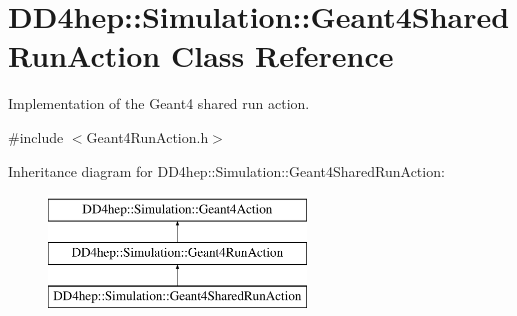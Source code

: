 \hypertarget{class_d_d4hep_1_1_simulation_1_1_geant4_shared_run_action}{}\section{D\+D4hep\+:\+:Simulation\+:\+:Geant4\+Shared\+Run\+Action Class Reference}
\label{class_d_d4hep_1_1_simulation_1_1_geant4_shared_run_action}


Implementation of the Geant4 shared run action.  




{\ttfamily \#include $<$Geant4\+Run\+Action.\+h$>$}

Inheritance diagram for D\+D4hep\+:\+:Simulation\+:\+:Geant4\+Shared\+Run\+Action\+:\begin{figure}[H]
\begin{center}
\leavevmode
\includegraphics[height=3.000000cm]{class_d_d4hep_1_1_simulation_1_1_geant4_shared_run_action}
\end{center}
\end{figure}
